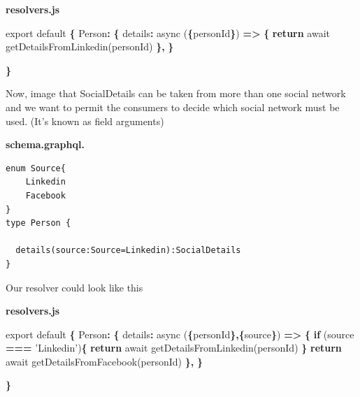 \documentclass[]{book}
\newenvironment{Shaded}{\begin{snugshade}}{\end{snugshade}}
\newcommand{\DataTypeTok}[1]{\textcolor[rgb]{0.13,0.29,0.53}{#1}}
\newcommand{\StringTok}[1]{\textcolor[rgb]{0.31,0.60,0.02}{#1}}
\newcommand{\ImportTok}[1]{#1}
\newcommand{\ControlFlowTok}[1]{\textcolor[rgb]{0.13,0.29,0.53}{\textbf{#1}}}
\newcommand{\OperatorTok}[1]{\textcolor[rgb]{0.81,0.36,0.00}{\textbf{#1}}}
\newcommand{\AttributeTok}[1]{\textcolor[rgb]{0.77,0.63,0.00}{#1}}
\newcommand{\NormalTok}[1]{#1}
\begin{document}
\textbf{resolvers.js}

\begin{Shaded}
\begin{Highlighting}[]
\ImportTok{export} \ImportTok{default} \OperatorTok{\{}
    \DataTypeTok{Person}\OperatorTok{:} \OperatorTok{\{}
        \DataTypeTok{details}\OperatorTok{:} \AttributeTok{async}\NormalTok{ (}\OperatorTok{\{}\NormalTok{personId}\OperatorTok{\}}\NormalTok{) }\OperatorTok{=>} \OperatorTok{\{}
            \ControlFlowTok{return}\NormalTok{ await }\AttributeTok{getDetailsFromLinkedin}\NormalTok{(personId)}
        \OperatorTok{\},}
    \OperatorTok{\}}
    
\OperatorTok{\}}
\end{Highlighting}
\end{Shaded}

Now, image that SocialDetails can be taken from more than one social
network and we want to permit the consumers to decide which social
network must be used. (It's known as field arguments)

\textbf{schema.graphql.}

\begin{verbatim}
enum Source{
    Linkedin
    Facebook
}
type Person {

  details(source:Source=Linkedin):SocialDetails
}
\end{verbatim}

Our resolver could look like this

\textbf{resolvers.js}

\begin{Shaded}
\begin{Highlighting}[]
\ImportTok{export} \ImportTok{default} \OperatorTok{\{}
    \DataTypeTok{Person}\OperatorTok{:} \OperatorTok{\{}
        \DataTypeTok{details}\OperatorTok{:} \AttributeTok{async}\NormalTok{ (}\OperatorTok{\{}\NormalTok{personId}\OperatorTok{\},\{}\NormalTok{source}\OperatorTok{\}}\NormalTok{) }\OperatorTok{=>} \OperatorTok{\{}
            \ControlFlowTok{if}\NormalTok{ (source }\OperatorTok{===} \StringTok{'Linkedin'}\NormalTok{)}\OperatorTok{\{}
                \ControlFlowTok{return}\NormalTok{ await }\AttributeTok{getDetailsFromLinkedin}\NormalTok{(personId)    }
            \OperatorTok{\}}
            \ControlFlowTok{return}\NormalTok{ await }\AttributeTok{getDetailsFromFacebook}\NormalTok{(personId)}
        \OperatorTok{\},}
    \OperatorTok{\}}
    
\OperatorTok{\}}
\end{Highlighting}
\end{Shaded}
\end{document}
